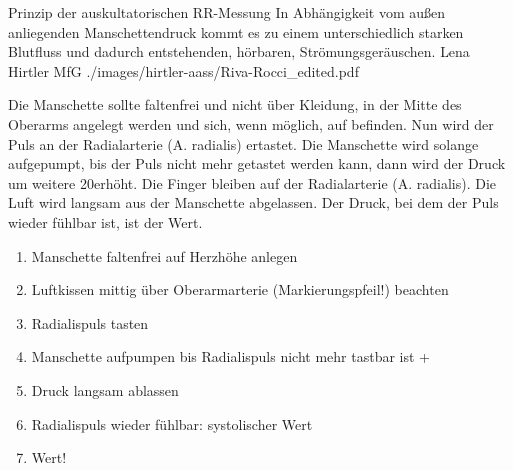 


\Picture
{Prinzip
    der auskultatorischen RR-Messung}%
{In Abhängigkeit vom
    außen anliegenden Manschettendruck kommt es zu einem
    unterschiedlich starken Blutfluss und dadurch
    entstehenden, hörbaren, Strömungsgeräuschen.}%
{}%
{Lena Hirtler}%
{MfG}%
{./images/hirtler-aass/Riva-Rocci_edited.pdf}%
{}%


{%
Die Manschette sollte faltenfrei und nicht über Kleidung, in
der Mitte des Oberarms angelegt werden und sich, wenn
möglich, auf  befinden. Nun wird der Puls an der
Radialarterie (A. radialis) ertastet. Die Manschette wird
solange aufgepumpt, bis der Puls nicht mehr getastet werden
kann, dann wird der Druck um weitere 20\MmHg* erhöht. Die
Finger bleiben auf der Radialarterie (A.
radialis). Die Luft wird langsam aus der Manschette
abgelassen. Der Druck, bei dem der Puls wieder fühlbar ist,
ist der  Wert. 

\bigskip
}{
\begin{enumerate}
  \item Manschette faltenfrei auf Herzhöhe anlegen
  \item Luftkissen  mittig über Oberarmarterie
  (Markierungspfeil!) beachten
  \item Radialispuls tasten
  \item Manschette aufpumpen bis Radialispuls nicht mehr tastbar ist
  +~\,\MmHg
  \item Druck langsam ablassen
  \item Radialispuls wieder fühlbar: systolischer Wert
  \item {}  Wert!
\end{enumerate}
}{}{}{}




